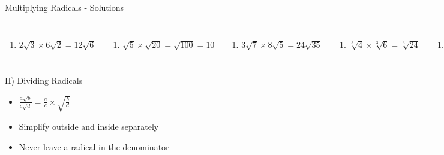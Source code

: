 \documentclass[aspectratio=169]{beamer}
\begin{document}
\begin{frame}{Multiplying Radicals - Solutions}
\begin{tcolorbox}[colback=lightgray,colframe=primary,title=Solutions]
\footnotesize
\begin{columns}[T]
\begin{enumerate}[label=1\textbf{a})]
  \item $2\sqrt{3} \times 6\sqrt{2} = 12\sqrt{6}$
\end{enumerate}
\begin{enumerate}[label=1\textbf{b})]
  \item $\sqrt{5} \times \sqrt{20} = \sqrt{100} = 10$
\end{enumerate}
\begin{enumerate}[label=1\textbf{c})]
  \item $3\sqrt{7} \times 8\sqrt{5} = 24\sqrt{35}$
\end{enumerate}
\begin{enumerate}[label=1\textbf{d})]
  \item $\sqrt[3]{4} \times \sqrt[3]{6} = \sqrt[3]{24}$
\end{enumerate}
\begin{enumerate}[label=1\textbf{e})]
  \item $2\sqrt{10} \times 7\sqrt{90} = 14\sqrt{900} = 14 \times 30 = 420$
\end{enumerate}
\begin{enumerate}[label=1\textbf{f})]
  \item $\sqrt{8x} \times \sqrt{2x^3} = \sqrt{16x^4} = 4x^2$
\end{enumerate}
\end{columns}
\end{tcolorbox}
\end{frame}

\begin{frame}{II) Dividing Radicals}
\begin{tcolorbox}[colback=lightgray,colframe=primary,title=Rules]
\footnotesize
\begin{itemize}
  \item $\frac{a\sqrt{b}}{c\sqrt{d}} = \frac{a}{c} \times \sqrt{\frac{b}{d}}$
  \item Simplify outside and inside separately
  \item Never leave a radical in the denominator
\end{itemize}
\end{tcolorbox}
\end{frame}
\end{document}
